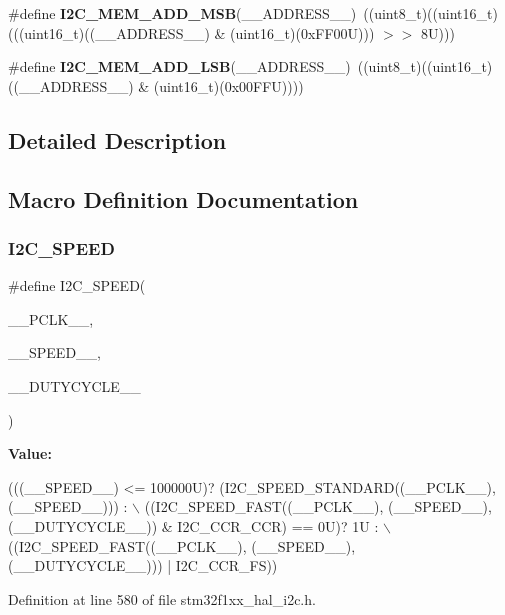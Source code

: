 \begin{DoxyCompactItemize}
\#define {\bfseries I2\+C\+\_\+\+M\+E\+M\+\_\+\+A\+D\+D\+\_\+\+M\+SB}(\+\_\+\+\_\+\+A\+D\+D\+R\+E\+S\+S\+\_\+\+\_\+)~((uint8\+\_\+t)((uint16\+\_\+t)(((uint16\+\_\+t)((\+\_\+\+\_\+\+A\+D\+D\+R\+E\+S\+S\+\_\+\+\_\+) \& (uint16\+\_\+t)(0x\+F\+F00\+U))) $>$$>$ 8\+U)))
\item 
\mbox{\label{group___i2_c___private___macros_ga9c8f1a763307d0c37bb4e2dcfdf3bb9f}} 
\#define {\bfseries I2\+C\+\_\+\+M\+E\+M\+\_\+\+A\+D\+D\+\_\+\+L\+SB}(\+\_\+\+\_\+\+A\+D\+D\+R\+E\+S\+S\+\_\+\+\_\+)~((uint8\+\_\+t)((uint16\+\_\+t)((\+\_\+\+\_\+\+A\+D\+D\+R\+E\+S\+S\+\_\+\+\_\+) \& (uint16\+\_\+t)(0x00\+F\+F\+U))))
\end{DoxyCompactItemize}


\subsection{Detailed Description}


\subsection{Macro Definition Documentation}
\mbox{\label{group___i2_c___private___macros_ga0e871b470a0f7a9d641156f07e37c810}} 
\subsubsection{\texorpdfstring{I2\+C\+\_\+\+S\+P\+E\+ED}{I2C\_SPEED}}
{\footnotesize\ttfamily \#define I2\+C\+\_\+\+S\+P\+E\+ED(\begin{DoxyParamCaption}\item[{}]{\+\_\+\+\_\+\+P\+C\+L\+K\+\_\+\+\_\+,  }\item[{}]{\+\_\+\+\_\+\+S\+P\+E\+E\+D\+\_\+\+\_\+,  }\item[{}]{\+\_\+\+\_\+\+D\+U\+T\+Y\+C\+Y\+C\+L\+E\+\_\+\+\_\+ }\end{DoxyParamCaption})}

{\bfseries Value\+:}
\begin{DoxyCode}
(((\_\_SPEED\_\_) <= 100000U)? (I2C\_SPEED\_STANDARD((\_\_PCLK\_\_), (\_\_SPEED\_\_))) : \(\backslash\)
                                                                  ((I2C\_SPEED\_FAST((\_\_PCLK\_\_), (\_\_SPEED\_\_),
       (\_\_DUTYCYCLE\_\_)) & I2C\_CCR\_CCR) == 0U)? 1U : \(\backslash\)
                                                                  ((I2C\_SPEED\_FAST((\_\_PCLK\_\_), (\_\_SPEED\_\_),
       (\_\_DUTYCYCLE\_\_))) | I2C\_CCR\_FS))
\end{DoxyCode}


Definition at line 580 of file stm32f1xx\+\_\+hal\+\_\+i2c.\+h.

